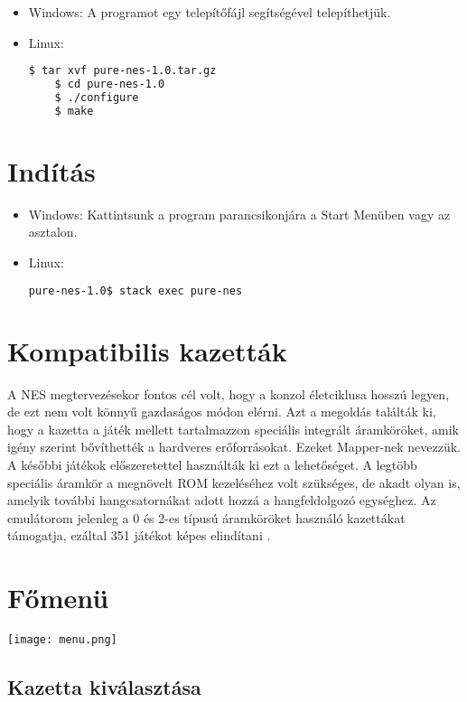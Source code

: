 \begin{itemize}
	\item Windows: A programot egy telepítőfájl segítségével telepíthetjük.
	\item Linux:
	\begin{lstlisting}[language=bash]
	$ tar xvf pure-nes-1.0.tar.gz
	$ cd pure-nes-1.0
	$ ./configure
	$ make
	\end{lstlisting}
\end{itemize}

\section{Indítás}
\begin{itemize}
	\item Windows: Kattintsunk a program parancsikonjára a Start Menüben vagy az asztalon.
	\item Linux:
	\begin{lstlisting}[language=bash]
	pure-nes-1.0$ stack exec pure-nes
	\end{lstlisting}
\end{itemize}


\section{Kompatibilis kazetták}

A NES megtervezésekor fontos cél volt, hogy a konzol életciklusa hosszú legyen, de ezt nem volt könnyű gazdaságos módon elérni. Azt a megoldás találták ki, hogy a kazetta a játék mellett tartalmazzon speciális integrált áramköröket, amik igény szerint bővíthették a hardveres erőforrásokat. Ezeket Mapper-nek nevezzük. A későbbi játékok előszeretettel használták ki ezt a lehetőséget. A legtöbb speciális áramkör a megnövelt ROM kezeléséhez volt szükséges, de akadt olyan is, amelyik további hangcsatornákat adott hozzá a hangfeldolgozó egységhez. Az emulátorom jelenleg a 0 és 2-es típusú áramköröket használó kazettákat támogatja, ezáltal 351 játékot képes elindítani \cite{ROM lista}.      

\section{Főmenü}

\begin{center}
	\texttt{[image: menu.png]}
\end{center}

\subsection{Kazetta kiválasztása}

